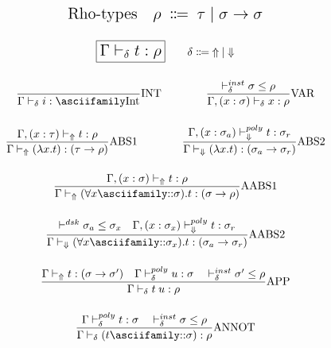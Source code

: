 \newpage


\newcommand{\Qquad}{\hspace{0.25em}}
\newcommand{\mexp}[1]{\mathnormal{#1}}
\newcommand{\msyn}[1]{\normalfont\asciifamily\text{#1}}
\newcommand{\mlg}[1]{\mathlarger{\mathlarger{#1}}}

\begin{figure}[h]
  \begin{tcolorbox}[breakable, colback=white]
    \small
    \begin{gather*}
      \mlg{\text{Rho-types} \quad \rho \Qquad \Coloneqq \Qquad \tau \mid \sigma \to \sigma}
      \\[\bigskipamount]
      \boxed{\mlg{\Gamma \vdash_\delta \mexp{t} : \rho}} \qquad \delta \Coloneqq \Qquad \Uparrow \Qquad \mid \Qquad \Downarrow
      \\[\bigskipamount]
      \frac{}{\Gamma \vdash_\delta \mexp{i} : \msyn{Int}} \text{INT}
      \qquad \qquad
      \frac{\mexp{\vdash_\delta^{inst} \sigma \leq \rho}}{\Gamma, \mexp{(x:\sigma) \vdash_\delta x : \rho}} \text{VAR}
      \\[\bigskipamount]
      \frac{\Gamma, \mexp{(x:\tau) \vdash_\Uparrow \mexp{t} : \rho}}{\Gamma \Qquad \mexp{\vdash_\Uparrow (\lambda x.t) : (\tau \to \rho)}} \text{ABS1}
      \qquad \qquad
      \frac{\Gamma, \mexp{(x:\sigma_a) \vdash_\Downarrow^{poly} t : \sigma_r}}{\Gamma \Qquad \mexp{\vdash_\Downarrow (\lambda x.t) : (\sigma_a \to \sigma_r)}} \text{ABS2}
      \\[\bigskipamount]
      \frac{\Gamma, \mexp{(x:\sigma) \vdash_\Uparrow t : \rho}}{\Gamma \Qquad \mexp{\vdash_\Uparrow (\forall x \msyn{::} \sigma).t : (\sigma \to \rho)}} \text{AABS1}
      \\[\bigskipamount]
      \frac{\mexp{\vdash^{dsk} \sigma_a \leq \sigma_x} \quad \Gamma, \mexp{(x:\sigma_x) \vdash_\Downarrow^{poly} t : \sigma_r}}{\Gamma \Qquad \mexp{\vdash_\Downarrow (\forall x \msyn{::} \sigma_x).t : (\sigma_a \to \sigma_r)}} \text{AABS2}
      \\[\bigskipamount]
      \frac{\Gamma \Qquad \mexp{\vdash_\Uparrow t : (\sigma \to \sigma')} \quad \Gamma \Qquad \mexp{\vdash_\delta^{poly} u : \sigma \quad \vdash_\delta^{inst} \sigma' \leq \rho}}{\Gamma \Qquad \mexp{\vdash_\delta t \Qquad u : \rho}} \text{APP}
      \\[\bigskipamount]
      \frac{\Gamma \Qquad \mexp{\vdash_\delta^{poly} t : \sigma \quad \vdash_\delta^{inst} \sigma \leq \rho}}{\Gamma \Qquad \mexp{\vdash_\delta (t \msyn{::} \sigma) : \rho}} \text{ANNOT}

\end{gather*}
\end{tcolorbox}
\end{figure}
